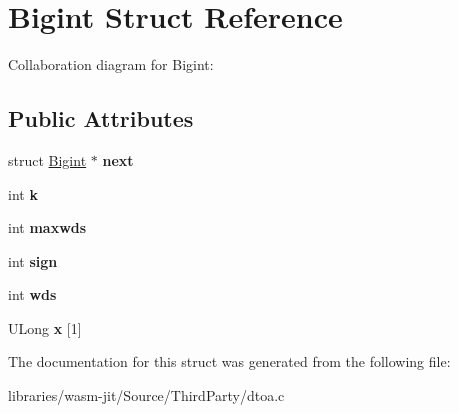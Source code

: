 \hypertarget{struct_bigint}{}\section{Bigint Struct Reference}
\label{struct_bigint}


Collaboration diagram for Bigint\+:
\subsection*{Public Attributes}
\begin{DoxyCompactItemize}
\item 
\mbox{\label{struct_bigint_a3a1296e26ef617e775d5e366e390e7fc}} 
struct \mbox{\hyperlink{struct_bigint}{Bigint}} $\ast$ {\bfseries next}
\item 
\mbox{\label{struct_bigint_a032d76e80da2f21df10c0794244d12f2}} 
int {\bfseries k}
\item 
\mbox{\label{struct_bigint_a5ffcac6f95ded3bc1fc23204f46f10d0}} 
int {\bfseries maxwds}
\item 
\mbox{\label{struct_bigint_a4380eb98f7653bb74d8377c0d68d6cb7}} 
int {\bfseries sign}
\item 
\mbox{\label{struct_bigint_aa737992ebddb9d6a7e2d23bfecdb080e}} 
int {\bfseries wds}
\item 
\mbox{\label{struct_bigint_ae56981315f471a190603887aee98ca99}} 
U\+Long {\bfseries x} \mbox{[}1\mbox{]}
\end{DoxyCompactItemize}


The documentation for this struct was generated from the following file\+:\begin{DoxyCompactItemize}
\item 
libraries/wasm-\/jit/\+Source/\+Third\+Party/dtoa.\+c\end{DoxyCompactItemize}
